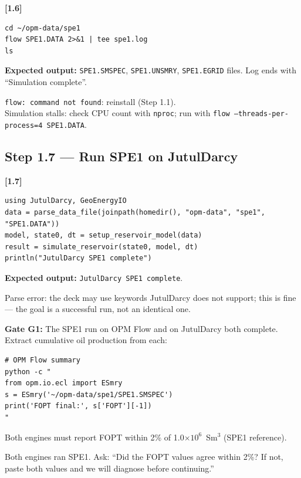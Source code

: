 \documentclass[10pt,a4paper]{article}
\newcommand{\stepID}[1]{\textsf{\textbf{[#1]}}}
\newcommand{\cmd}[1]{\texttt{#1}}
\begin{document}
\stepID{1.6}
\begin{lstlisting}[style=sh]
cd ~/opm-data/spe1
flow SPE1.DATA 2>&1 | tee spe1.log
ls
\end{lstlisting}

\textbf{Expected output:} \cmd{SPE1.SMSPEC}, \cmd{SPE1.UNSMRY}, \cmd{SPE1.EGRID} files. Log ends with ``Simulation complete''.

\begin{failure}
\texttt{flow: command not found}: reinstall (Step 1.1).\\
Simulation stalls: check CPU count with \cmd{nproc}; run with \cmd{flow --threads-per-process=4 SPE1.DATA}.
\end{failure}

\subsection{Step 1.7 --- Run SPE1 on JutulDarcy}

\stepID{1.7}
\begin{lstlisting}[style=jl]
using JutulDarcy, GeoEnergyIO
data = parse_data_file(joinpath(homedir(), "opm-data", "spe1", "SPE1.DATA"))
model, state0, dt = setup_reservoir_model(data)
result = simulate_reservoir(state0, model, dt)
println("JutulDarcy SPE1 complete")
\end{lstlisting}

\textbf{Expected output:} \cmd{JutulDarcy SPE1 complete}.

\begin{failure}
Parse error: the deck may use keywords JutulDarcy does not support; this is fine --- the goal is a successful run, not an identical one.
\end{failure}

\begin{gate}
\textbf{Gate G1:} The SPE1 run on OPM Flow and on JutulDarcy both complete. Extract cumulative oil production from each:
\begin{lstlisting}[style=sh]
# OPM Flow summary
python -c "
from opm.io.ecl import ESmry
s = ESmry('~/opm-data/spe1/SPE1.SMSPEC')
print('FOPT final:', s['FOPT'][-1])
"
\end{lstlisting}
Both engines must report FOPT within 2\% of 1.0$\times 10^6$~Sm$^3$ (SPE1 reference).
\end{gate}

\begin{aicheckpoint}
Both engines ran SPE1. Ask: ``Did the FOPT values agree within 2\%? If not, paste both values and we will diagnose before continuing.''
\end{aicheckpoint}
\end{document}
